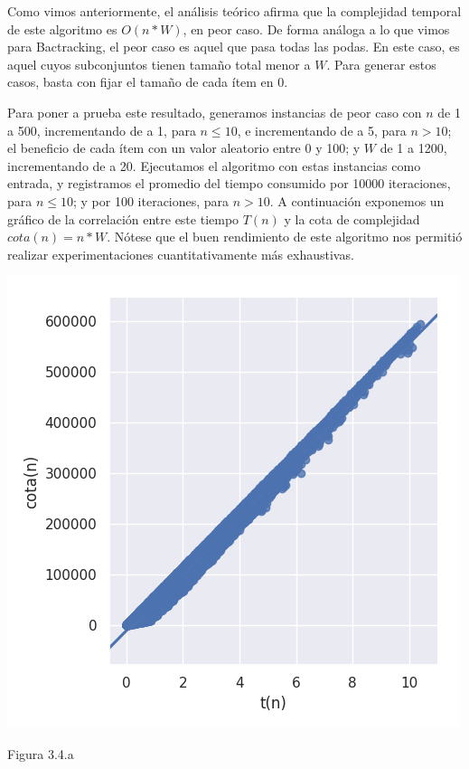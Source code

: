 \documentclass[a4paper]{article}
\begin{document}
Como vimos anteriormente, el análisis teórico afirma que la complejidad temporal de este algoritmo es $O(n*W)$, en peor caso. De forma análoga a lo que vimos para Bactracking, el peor caso es aquel que pasa todas las podas. En este caso, es aquel cuyos subconjuntos tienen tamaño total menor a $W$. Para generar estos casos, basta con fijar el tamaño de cada ítem en 0.

Para poner a prueba este resultado, generamos instancias de peor caso con $n$ de 1 a 500, incrementando de a 1, para $n \leq 10 $, e incrementando de a 5, para $n > 10$; el beneficio de cada ítem con un valor aleatorio entre 0 y 100; y $W$ de 1 a 1200, incrementando de a 20. Ejecutamos el algoritmo con estas instancias como entrada, y registramos el promedio del tiempo consumido por 10000 iteraciones, para $n \leq 10$; y por 100 iteraciones, para $n > 10$. A continuación exponemos un gráfico de la correlación entre este tiempo $T(n)$ y la cota de complejidad $cota(n) = n*W $. Nótese que el buen rendimiento de este algoritmo nos permitió realizar experimentaciones cuantitativamente más exhaustivas.  


\begin{center}
    \includegraphics[scale=0.8]{PDcorrelacConCota.png}
    
    
	\caption{Figura 3.4.a  }
  \end{center}
\end{document}
